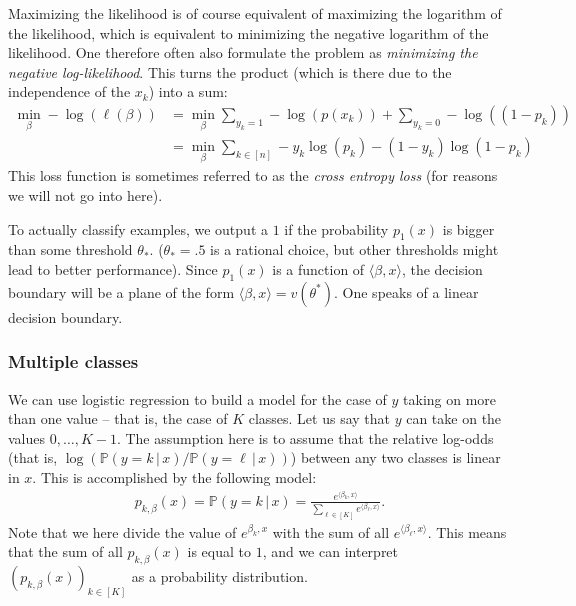 \documentclass{article}
\newcommand{\sprod}[1]{\langle #1 \rangle}
\begin{document}
Maximizing the likelihood is of course equivalent of maximizing the logarithm of the likelihood, which is equivalent to minimizing the negative logarithm of the likelihood. One therefore often also formulate the problem as \emph{minimizing the negative log-likelihood}. This turns the product (which is there due to the independence of the $x_k$) into a sum:
\begin{align*}
    \min_{\beta} - \log(\ell(\beta)) &= \min_\beta \sum_{y_k=1} -\log(p(x_k)) + \sum_{y_k=0} -\log((1-p_k)) \\
    &= \min_\beta \sum_{k \in [n]} -y_k\log(p_k)-(1-y_k)\log(1-p_k) 
\end{align*}
This loss function is sometimes referred to as the \emph{cross entropy loss} (for reasons we will not go into here).

To actually classify examples, we output a $1$ if the probability $p_1(x)$ is bigger than some threshold $\theta_*$. ($\theta_*=.5$ is a rational choice, but other thresholds might lead to better performance). Since $p_1(x)$ is a function of $\sprod{\beta,x}$, the decision boundary will be a plane of the form $\sprod{\beta,x}=v(\theta^*)$. One speaks of a linear decision boundary.

\subsubsection{Multiple classes} We can use logistic regression to build a model for the case of $y$ taking on more than one value -- that is, the case of $K$ classes. Let us say that $y$ can take on the values $0,\dots, K-1$. The assumption here is to assume that the relative log-odds
(that is, $\log(\mathbb{P}(y=k \, \vert \, x)/\mathbb{P}(y=\ell \, \vert \, x ))$) between any two classes is linear in $x$. This is accomplished by the following model:
\begin{align*}
    p_{k,\beta}(x) = \mathbb{P}(y=k \, \vert \, x) = \frac{e^{\sprod{\beta_k,x}}}{\sum_{\ell\in [K]}e^{\sprod{\beta_\ell,x}}}.
\end{align*}
Note that we here divide the value of $e^{\beta_k,x}$ with the sum of all $e^{\sprod{\beta_\ell,x}}$. This means that the sum of all $p_{k,\beta}(x)$ is equal to $1$, and we can interpret $(p_{k,\beta}(x))_{k\in[K]}$ as a probability distribution.
\end{document}
